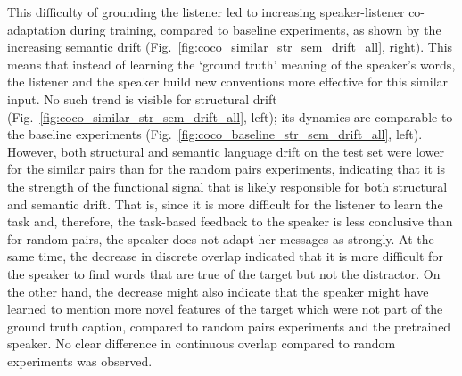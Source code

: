 This difficulty of grounding the listener led to increasing speaker-listener co-adaptation during training, compared to baseline experiments, as shown by the increasing semantic drift (Fig.~\ref{fig:coco_similar_str_sem_drift_all}, right). This means that instead of learning the `ground truth' meaning of the speaker's words, the listener and the speaker build new conventions more effective for this similar input. No such trend is visible for structural drift (Fig.~\ref{fig:coco_similar_str_sem_drift_all}, left); its dynamics are comparable to the baseline experiments (Fig.~\ref{fig:coco_baseline_str_sem_drift_all}, left). 
However, both structural and semantic language drift on the test set were lower for the similar pairs than for the random pairs experiments, indicating that it is the strength of the functional signal that is likely responsible for both structural and semantic drift. That is, since it is more difficult for the listener to learn the task and, therefore, the task-based feedback to the speaker is less conclusive than for random pairs, the speaker does not adapt her messages as strongly.
At the same time, the decrease in discrete overlap indicated that it is more difficult for the speaker to find words that are true of the target but not the distractor. On the other hand, the decrease might also indicate that the speaker might have learned to mention more novel features of the target which were not part of the ground truth caption, compared to random pairs experiments and the pretrained speaker. No clear difference in continuous overlap compared to random experiments was observed.

